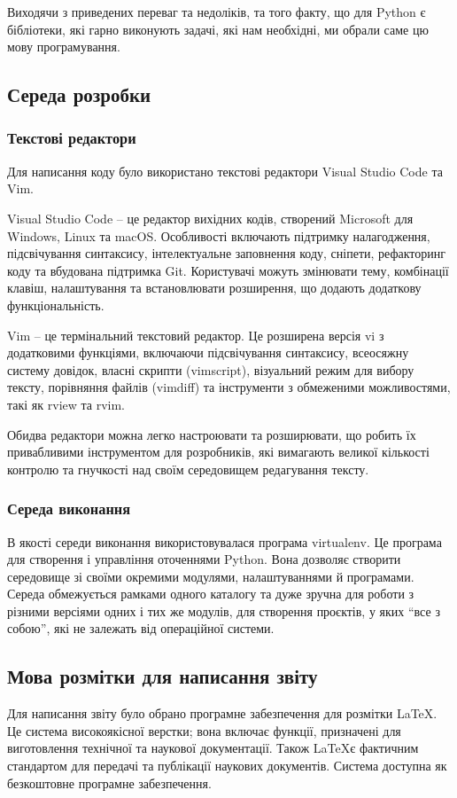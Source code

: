 \documentclass[a4paper,14pt]{extreport}
\begin{document}
        Виходячи з приведених переваг та недоліків, та того факту, що для Python є бібліотеки, які гарно виконують задачі, які нам необхідні, ми обрали саме цю мову програмування.

    \subsection{Середа розробки}
        \subsubsection{Текстові редактори}
        Для написання коду було використано текстові редактори Visual Studio Code та Vim.

        Visual Studio Code -- це редактор вихідних кодів, створений Microsoft для Windows, Linux та macOS. Особливості включають підтримку налагодження, підсвічування синтаксису, інтелектуальне заповнення коду, сніпети, рефакторинг коду та вбудована підтримка Git. Користувачі можуть змінювати тему, комбінації клавіш, налаштування та встановлювати розширення, що додають додаткову функціональність.

        Vim -- це термінальний текстовий редактор. Це розширена версія vi з додатковими функціями, включаючи підсвічування синтаксису, всеосяжну систему довідок, власні скрипти (vimscript), візуальний режим для вибору тексту, порівняння файлів (vimdiff) та інструменти з обмеженими можливостями, такі як rview та rvim.

        Обидва редактори можна легко настроювати та розширювати, що робить їх привабливими інструментом для розробників, які вимагають великої кількості контролю та гнучкості над своїм середовищем редагування тексту.
        
        \subsubsection{Середа виконання}
        В якості середи виконання використовувалася програма virtualenv. Це програма для створення і управління оточеннями Python. Вона дозволяє створити середовище зі своїми окремими модулями, налаштуваннями й програмами. Середа обмежується рамками одного каталогу та дуже зручна для роботи з різними версіями одних і тих же модулів, для створення проєктів, у яких ``все з собою'', які не залежать від операційної системи.

\subsection{Мова розмітки для написання звіту}
    Для написання звіту було обрано програмне забезпечення для розмітки \LaTeX. Це система високоякісної верстки; вона включає функції, призначені для виготовлення технічної та наукової документації. Також \LaTeX є фактичним стандартом для передачі та публікації наукових документів. Система доступна як безкоштовне програмне забезпечення.
\end{document}
